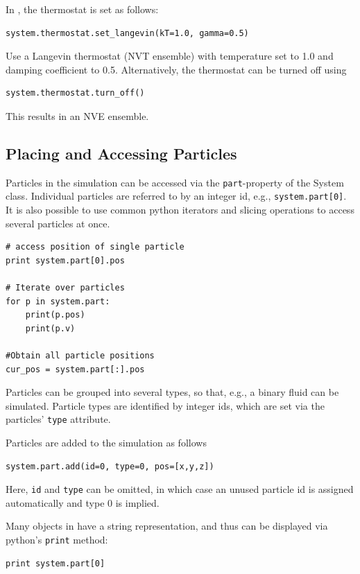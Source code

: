 \documentclass[
paper=a4,                       %
fontsize=11pt,                  %
twoside,                        %
footsepline,                    %
headsepline,                    %
headinclude=false,              %
footinclude=false,              %
pagesize,                       %
]{scrartcl}
\begin{document}
In \es{}, the thermostat is set as follows:
{\small\vspace{0,2cm}
\begin{lstlisting}
system.thermostat.set_langevin(kT=1.0, gamma=0.5)
\end{lstlisting}}\vspace{0,2cm}
\noindent Use a Langevin thermostat (NVT ensemble) with temperature set to 1.0 and damping coefficient to 0.5. Alternatively, the thermostat can be turned off using
{\small\vspace{0,2cm}
\begin{lstlisting}
system.thermostat.turn_off()
\end{lstlisting}}\vspace{0,2cm}
\noindent This results in an NVE ensemble.


\subsection{Placing and Accessing Particles}

Particles in the simulation can be accessed via the \texttt{part}-property of the System class. Individual particles are referred to by an integer id, e.g., \texttt{system.part[0]}. It is also possible to use common python iterators and slicing operations to access several particles at once.
\begin{lstlisting}
# access position of single particle
print system.part[0].pos

# Iterate over particles
for p in system.part:
    print(p.pos)
    print(p.v)

#Obtain all particle positions
cur_pos = system.part[:].pos
\end{lstlisting}
Particles can be grouped into several types, so that, e.g., a binary fluid can be simulated. Particle types are identified by integer ids, which are set via the particles' \texttt{type} attribute. 

Particles are added to the simulation as follows
\begin{lstlisting}
system.part.add(id=0, type=0, pos=[x,y,z])
\end{lstlisting}\vspace{0,2cm}
Here, \texttt{id} and \texttt{type} can be omitted, in which case an unused particle
id is assigned automatically and type 0 is implied.

Many objects in \es{} have a string representation, and thus can be displayed via python's \texttt{print} method:
\begin{lstlisting}
print system.part[0]
\end{lstlisting}\vspace{0,2cm}
\end{document}
